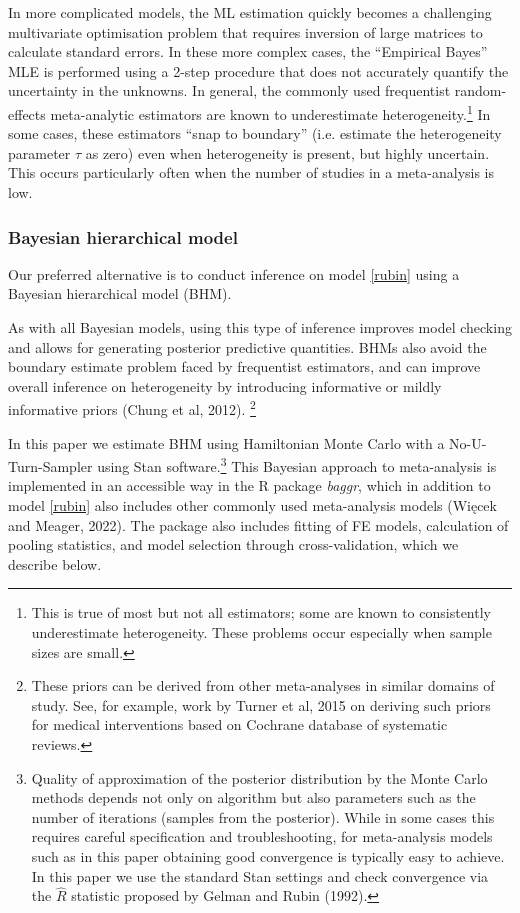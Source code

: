 \documentclass[12pt]{article}
\begin{document}
In more complicated models, the ML estimation quickly becomes a challenging multivariate optimisation problem that requires inversion of large matrices to calculate standard errors. In these more complex cases, the ``Empirical Bayes'' MLE is performed using a 2-step procedure that does not accurately quantify the uncertainty in the unknowns. In general, the commonly used frequentist random-effects meta-analytic estimators are known to underestimate heterogeneity.\footnote{This is true of most but not all estimators; some are known to consistently underestimate heterogeneity. These problems occur especially when sample sizes are small.} In some cases, these estimators ``snap to boundary'' (i.e. estimate the heterogeneity parameter $\tau$ as zero) even when heterogeneity is present, but highly uncertain. This occurs particularly often when the number of studies in a meta-analysis is low.

\subsubsection*{Bayesian hierarchical model}

Our preferred alternative is to conduct inference on model \eqref{rubin} using a Bayesian hierarchical model (BHM). 

As with all Bayesian models, using this type of inference improves model checking and allows for generating posterior predictive quantities. BHMs also avoid the boundary estimate problem faced by frequentist estimators, and can improve overall inference on heterogeneity by introducing informative or mildly informative priors (Chung et al, 2012). \footnote{These priors can be derived from other meta-analyses in similar domains of study. See, for example, work by Turner et al, 2015 on deriving such priors for medical interventions based on Cochrane database of systematic reviews.} 

In this paper we estimate BHM using Hamiltonian Monte Carlo with a No-U-Turn-Sampler using Stan software.\footnote{Quality of approximation of the posterior distribution by the Monte Carlo methods depends not only on algorithm but also parameters such as the number of iterations (samples from the posterior). While in some cases this requires careful specification and troubleshooting, for meta-analysis models such as in this paper obtaining good convergence is typically easy to achieve. In this paper we use the standard Stan settings and check convergence via the $\hat{R}$ statistic proposed by Gelman and Rubin (1992).} This Bayesian approach to meta-analysis is implemented in an accessible way in the R package \textit{baggr}, which in addition to model \eqref{rubin} also includes other commonly used meta-analysis models (Więcek and Meager, 2022). The package also includes fitting of FE models, calculation of pooling statistics, and model selection through cross-validation, which we describe below.
\end{document}
